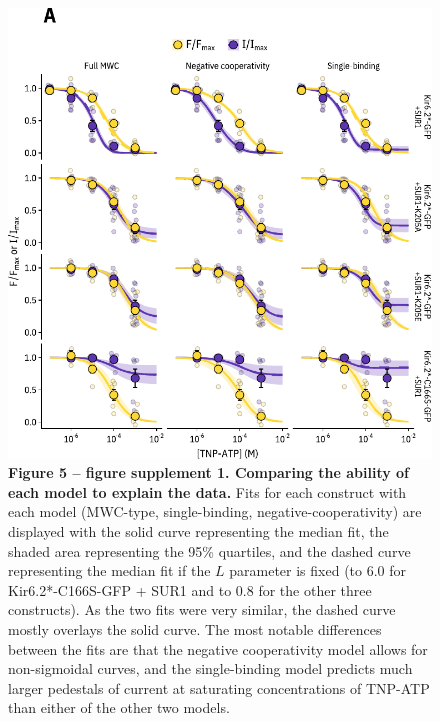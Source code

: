 \documentclass[10pt,lineno, doublespacing]{elife_modified}
\begin{document}
\begin{figure}
\begin{fullwidth}
\centering
\includegraphics[height=0.75\textheight]{figure_five_s2}
\captionsetup{labelformat=empty}
\caption{
\textbf{Figure 5 -- figure supplement 1. Comparing the ability of each model to explain the data. }
Fits for each construct with each model (MWC-type, single-binding, negative-cooperativity) are displayed with the solid curve representing the median fit, the shaded area representing the 95\% quartiles, and the dashed curve representing the median fit if the $L$ parameter is fixed (to 6.0 for Kir6.2*-C166S-GFP + SUR1 and to 0.8 for the other three constructs).
As the two fits were very similar, the dashed curve mostly overlays the solid curve.
The most notable differences between the fits are that the negative cooperativity model allows for non-sigmoidal curves, and the single-binding model predicts much larger pedestals of current at saturating concentrations of TNP-ATP than either of the other two models.
}
\label{fig:five_s2}
\end{fullwidth}
\end{figure}
\end{document}

